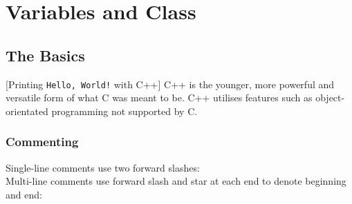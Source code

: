 \chapter{Variables and Class}

\section{The Basics}
\begingroup
{}
[Printing \texttt{Hello, World!} with C++]
\endgroup
C++ is the younger, more powerful and versatile form of what C was meant to be.
C++ utilises features such as object-orientated programming not supported by C.

\subsection{Commenting}
Single-line comments use two forward slashes: \\
Multi-line comments use forward slash and star at each end to denote beginning
and end: 

